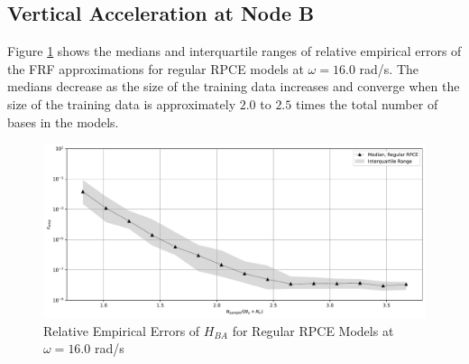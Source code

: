 %
%

\subsection{Vertical Acceleration at Node B}
\label{ssec: surrogate point B}

Figure \ref{FRF_rRPCE_B_A_16} shows the medians and interquartile ranges of relative empirical errors of the FRF approximations for regular RPCE models at $\omega=16.0$ rad/s.
The medians decrease as the size of the training data increases and converge when the size of the training data is approximately $2.0$ to $2.5$ times the total number of bases in the models.
\begin{figure}[H]
    \centering
    \includegraphics[width=1.0\textwidth]{
        plots/surrogate/plot_1P_B_16.pdf
    }
    \caption{%
        Relative Empirical Errors of $H_{BA}$ for Regular RPCE Models at $\omega=16.0$ rad/s
    }
    \label{FRF_rRPCE_B_A_16}
\end{figure}

